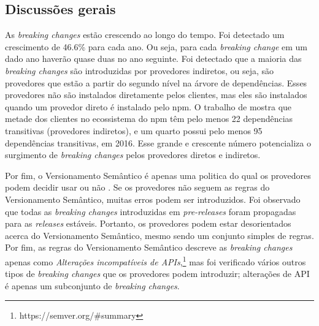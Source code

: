 \subsection{Discussões gerais}
\label{sub:disc:3}
As \textit{breaking changes} estão crescendo ao longo do tempo. Foi detectado um crescimento de 46.6\% para cada ano. Ou seja, para cada \textit{breaking change} em um dado ano haverão quase duas no ano seguinte. Foi detectado que a maioria das \textit{breaking changes} são introduzidas por provedores indiretos, ou seja, são provedores que estão a partir do segundo nível na árvore de dependências. Esses provedores não são instalados diretamente pelos clientes, mas eles são instalados quando um provedor direto é instalado pelo \textsf{npm}. O trabalho de  mostra que metade dos clientes no ecossistema do \textsf{npm} têm pelo menos 22 dependências transitivas (provedores indiretos), e um quarto possui pelo menos 95 dependências transitivas, em 2016. Esse grande e crescente número potencializa o surgimento de \textit{breaking changes} pelos provedores diretos e indiretos.

Por fim, o Versionamento Semântico é apenas uma politica do qual os provedores podem decidir usar ou não \cite{decan}. Se os provedores não seguem as regras do Versionamento Semântico, muitas erros podem ser introduzidos. Foi observado que todas as \textit{breaking changes} introduzidas em \textit{pre-releases} foram propagadas para as \textit{releases} estáveis. Portanto, os provedores podem estar desorientados acerca do Versionamento Semântico, mesmo sendo um conjunto simples de regras. Por fim, as regras do Versionamento Semântico descreve as \textit{breaking changes} apenas como \textit{Alterações incompatíveis de APIs},\footnote{https://semver.org/\#summary} mas foi verificado vários outros tipos de \textit{breaking changes} que os provedores podem introduzir; alterações de API é apenas um subconjunto de \textit{breaking changes}.